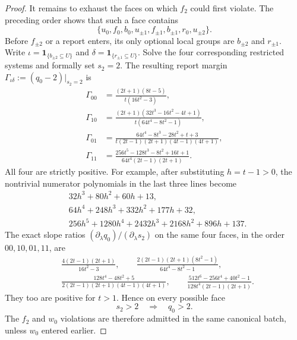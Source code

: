 \begin{proof}
It remains to exhaust the faces on which $f_2$ could first violate.  The
preceding order shows that such a face contains
\begin{equation*}
 \{u_0,f_0,b_0,u_{\pm1},f_{\pm1},b_{\pm1},r_0,u_{\pm2}\}.
\end{equation*}
Before $f_{\pm2}$ or a report enters, its only optional local groups are
$b_{\pm2}$ and $r_{\pm1}$.  Write
$\iota=\mathbf 1_{\{b_{\pm2}\subseteq U\}}$ and
$\delta=\mathbf 1_{\{r_{\pm1}\subseteq U\}}$.  Solve the four corresponding
restricted systems and formally set $s_2=2$.  The resulting report margin
$\Gamma_{\iota\delta}:=(q_0-2)|_{s_2=2}$ is
\begin{equation}
\begin{aligned}
 \Gamma_{00}&=\frac{(2t+1)(8t-5)}{t(16t^2-3)},\\
 \Gamma_{10}&=\frac{(2t+1)(32t^3-16t^2-4t+1)}
 {t(64t^4-8t^2-1)},\\
 \Gamma_{01}&=\frac{64t^4-8t^3-28t^2+t+3}
 {t(2t-1)(2t+1)(4t-1)(4t+1)},\\
 \Gamma_{11}&=\frac{256t^5-128t^3-8t^2+16t+1}
 {64t^4(2t-1)(2t+1)}.
\end{aligned}
 \label{eq:double-cycle-anchor-gamma}
\end{equation}
All four are strictly positive.  For example, after substituting $h=t-1>0$,
the nontrivial numerator polynomials in the last three lines become
\begin{align*}
 &32h^3+80h^2+60h+13,\\
 &64h^4+248h^3+332h^2+177h+32,\\
 &256h^5+1280h^4+2432h^3+2168h^2+896h+137.
\end{align*}
The exact slope ratios $(\partial_\lambda q_0)/(\partial_\lambda s_2)$ on
the same four faces, in the order $00,10,01,11$, are
\begin{equation}
\begin{split}
 &\frac{4(2t-1)(2t+1)}{16t^2-3},\qquad
 \frac{2(2t-1)(2t+1)(8t^2-1)}{64t^4-8t^2-1},\\
 &\frac{128t^4-48t^2+5}
 {2(2t-1)(2t+1)(4t-1)(4t+1)},\qquad
 \frac{512t^6-256t^4+40t^2-1}
 {128t^4(2t-1)(2t+1)}.
\end{split}
 \label{eq:double-cycle-anchor-slope}
\end{equation}
They too are positive for $t>1$.  Hence on every possible face
\begin{equation*}
 s_2>2\quad\Longrightarrow\quad q_0>2.
\end{equation*}
The $f_2$ and $w_0$ violations are therefore admitted in the same canonical
batch, unless $w_0$ entered earlier.


\end{proof}
